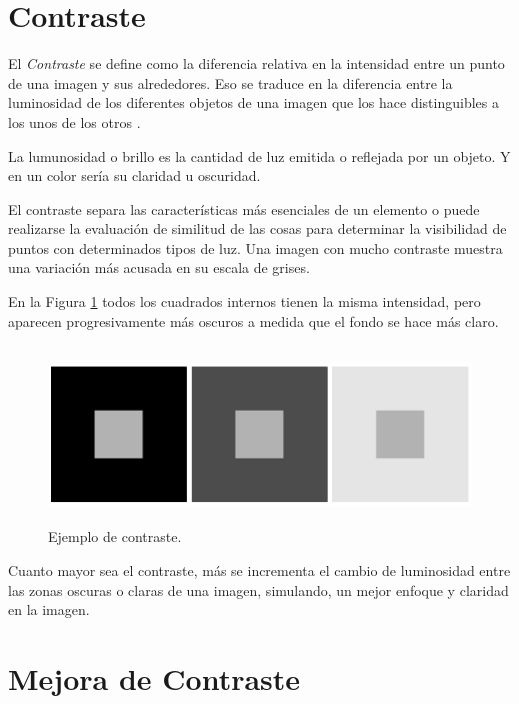 \section{Contraste}

El \textit{Contraste} se define como la diferencia relativa en la intensidad entre un punto de una imagen y sus alrededores. Eso se traduce en la diferencia entre la luminosidad de los diferentes objetos de una imagen que los hace distinguibles a los unos de los otros \cite{russ2010}.

La lumunosidad o brillo es la cantidad de luz emitida o reflejada por un objeto.  Y en un color sería su claridad u oscuridad.

El contraste separa las características más esenciales de un elemento o puede realizarse la evaluación de similitud de las cosas para determinar la visibilidad de puntos con determinados tipos de luz. Una imagen con mucho contraste muestra una variación más acusada en su escala de grises.

En la Figura \ref{contraste} todos los cuadrados internos tienen la misma intensidad, pero aparecen progresivamente más oscuros a medida que el fondo se hace más claro.

\begin{figure}[H]
  \begin{center}
    \leavevmode
    \includegraphics[height=4.7cm]{ej_contraste.png}
    \caption{Ejemplo de contraste.}
    \label{contraste}
  \end{center}
\end{figure}

Cuanto mayor sea el contraste, más se incrementa el cambio de luminosidad entre las zonas oscuras o claras de una imagen, simulando, un mejor enfoque y claridad en la imagen.


\section{Mejora de Contraste}

